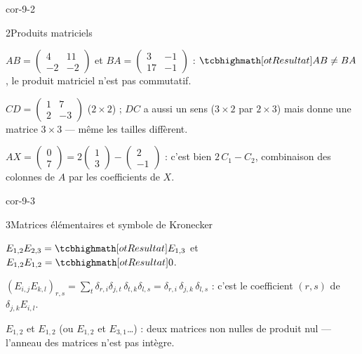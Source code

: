 \begin{blocLivre}{cor-9-2}
\begin{corrige}{2}{Produits matriciels}
\begin{questions}
  \item $AB=\begin{pmatrix}4&11\\-2&-2\end{pmatrix}$ et
    $BA=\begin{pmatrix}3&-1\\17&-1\end{pmatrix}$ :
    $\res{AB\neq BA}$, le produit matriciel n'est pas commutatif.
  \item $CD=\begin{pmatrix}1&7\\2&-3\end{pmatrix}$ ($2\times2$) ; $DC$ a
    aussi un sens ($3\times2$ par $2\times3$) mais donne une matrice
    $3\times3$ — même les tailles diffèrent.
  \item $AX=\begin{pmatrix}0\\7\end{pmatrix}
    =2\begin{pmatrix}1\\3\end{pmatrix}-\begin{pmatrix}2\\-1\end{pmatrix}$ :
    c'est bien $2\,C_1-C_2$, combinaison des colonnes de $A$ par les
    coefficients de $X$.
\end{questions}
\end{corrige}
\end{blocLivre}

\begin{blocLivre}{cor-9-3}
\begin{corrige}{3}{Matrices élémentaires et symbole de Kronecker}
\begin{questions}
  \item $E_{1,2}E_{2,3}=\res{E_{1,3}}$ et $E_{1,2}E_{1,2}=\res{0}$.
  \item $(E_{i,j}E_{k,l})_{r,s}=\sum_{t}\delta_{r,i}\delta_{j,t}\,
    \delta_{t,k}\delta_{l,s}=\delta_{r,i}\,\delta_{j,k}\,\delta_{l,s}$ :
    c'est le coefficient $(r,s)$ de $\delta_{j,k}E_{i,l}$.
  \item $E_{1,2}$ et $E_{1,2}$ (ou $E_{1,2}$ et $E_{3,1}$\dots) : deux
    matrices non nulles de produit nul — l'anneau des matrices n'est pas
    intègre.
\end{questions}
\end{corrige}
\end{blocLivre}

